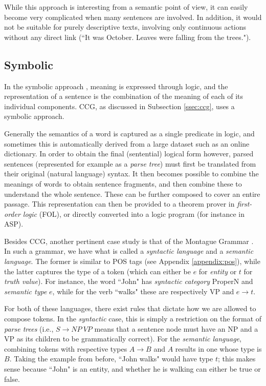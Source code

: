 While this approach is interesting from a semantic point of view, it can easily become very complicated when many sentences are involved. In addition, it would not be suitable for purely descriptive texts, involving only continuous actions without any direct link (``It was October. Leaves were falling from the trees.").

\subsection{Symbolic}

In the symbolic approach \cite{clark_combining_nodate}, meaning is expressed through logic, and the representation of a sentence is the combination of the meaning of each of its individual components. CCG, as discussed in Subsection \ref{ssec:ccg}, uses a symbolic approach.

Generally the semantics of a word is captured as a single predicate in logic, and sometimes this is automatically derived from a large dataset such as an online dictionary. In order to obtain the final (sentential) logical form however, parsed sentences (represented for example as a \textit{parse tree}) must first be translated from their original (natural language) syntax. It then becomes possible to combine the meanings of words to obtain sentence fragments, and then combine these to understand the whole sentence. These can be further composed to cover an entire passage. This representation can then be provided to a theorem prover in \textit{first-order logic} (FOL), or directly converted into a logic program (for instance in ASP).

\mbox{}

Besides CCG, another pertinent case study is that of the Montague Grammar \cite{partee_lecture_nodate}. In such a grammar, we have what is called a \textit{syntactic language} and a \textit{semantic language}. The former is similar to POS tags (see Appendix \ref{appendix:pos}), while the latter captures the type of a token (which can either be $e$ for \textit{entity} or $t$ for \textit{truth value}). For instance, the word ``John" has \textit{syntactic category} ProperN and \textit{semantic type} $e$, while for the verb ``walks" these are respectively VP and $e \to t$.

For both of these languages, there exist rules that dictate how we are allowed to compose tokens. In the \textit{syntactic} case, this is simply a restriction on the format of \textit{parse trees} (i.e., $S \to NP\ VP$ means that a sentence node must have an NP and a VP as its children to be grammatically correct). For the \textit{semantic language}, combining tokens with respective types $A \to B$ and $A$ results in one whose type is $B$. Taking the example from before, ``John walks" would have type $t$; this makes sense because ``John" is an entity, and whether he is walking can either be true or false.

